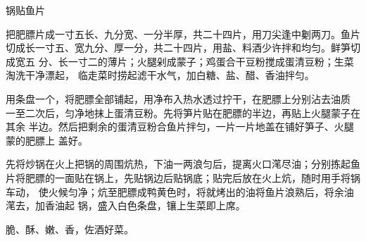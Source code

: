 %
%
%
%
%
%
%
\begin{recipe}{锅贴鱼片}

\ingredients


\preparation

\step 把肥膘片成一寸五长、九分宽、一分半厚，共二十四片，用刀尖逢中劖两刀。鱼片
切成长一寸五、宽九分、厚一分，共二十四片，用盐、料酒少许拌和均匀。鲜笋切成宽五
分、长一寸二的薄片；火腿剁成蒙子；鸡蛋合干豆粉搅成蛋清豆粉；生菜淘洗干净漂起，
临走菜时捞起滤干水气，加白糖、盐、醋、香油拌匀。

\step 用条盘一个，将肥膘全部铺起，用净布入热水透过拧干，在肥膘上分别沾去油质
一至二次后，匀净地抹上蛋清豆粉。先将笋片贴在肥膘的半边，再贴上火腿蒙子在其余
半边。然后把剩余的蛋清豆粉合鱼片拌匀，一片一片地盖在铺好笋子、火腿蒙的肥膘上
盖好。

\step 先将炒锅在火上把锅的周围炕热，下油一两浪匀后，提离火口滗尽油；分别拣起鱼
片将肥膘的一面贴在锅上，先贴锅边后贴锅底；贴完后放在火上炕，随时用手将锅车动，
使火候匀净；炕至肥膘成鸭黄色时，将就烤出的油将鱼片浪熟后，将余油滗去，加香油起
锅，盛入白色条盘，镶上生菜即上席。

\features

脆、酥、嫩、香，佐酒好菜。

\end{recipe}


